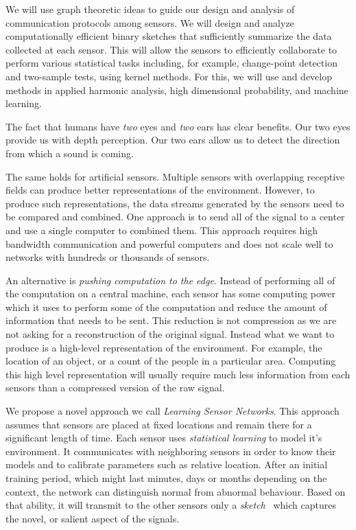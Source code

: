 \documentclass{article}
\begin{document}
We will use graph theoretic ideas to guide our design and analysis of communication protocols among sensors. We will design and analyze computationally efficient binary sketches that sufficiently summarize the data collected at each sensor. This will allow the sensors to efficiently collaborate to perform various statistical tasks including, for example, change-point detection and two-sample tests, using kernel methods. For this, we will use and develop methods in applied harmonic analysis, high dimensional probability, and machine learning.   






\iffalse The fact that humans have {\em two} eyes and {\em two} ears has clear
benefits. Our two eyes provide us with depth perception. Our two ears
allow us to detect the direction from which a sound is coming.

The same holds for artificial sensors. Multiple sensors with
overlapping receptive fields can produce better representations of the
environment. However, to produce such representations, the data
streams generated by the sensors need to be compared and combined. One
approach is to send all of the signal to a center and use a single
computer to combined them. This approach requires high bandwidth
communication and powerful computers and does not scale well to
networks with hundreds or thousands of sensors.

An alternative is {\em pushing computation to the edge}. Instead of
performing all of the computation on a central machine, each sensor
has some computing power which it uses to perform some of the
computation and reduce the amount of information that needs to be
sent. This reduction is not compression as we are not asking for a
reconstruction of the original signal. Instead what we want to produce
is a high-level representation of the environment. For example, the
location of an object, or a count of the people in a particular
area. Computing this high level representation will usually require
much less information from each sensors than a compressed version of
the raw signal.

We propose a novel approach we call {\em Learning Sensor Networks}.
This approach assumes that sensors are placed at fixed locations and
remain there for a significant length of time.  Each sensor uses {\em
  statistical learning} to model it's environment. It communicates
with neighboring sensors in order to know their models and to
calibrate parameters such as relative location. After an initial
training period, which might last minutes, days or months depending on
the context, the network can distinguish normal from abnormal
behaviour. Based on that ability, it will transmit to the other
sensors only a {\em sketch}~\cite{} which captures the novel, or
salient aspect of the signals.
\end{document}
